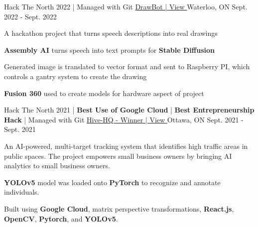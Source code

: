 \begin{cventries}

  \cventry
    {Hack The North 2022 | Managed with Git} %
    {\underline{DrawBot | \href{https://devpost.com/software/drawbot-ulof5z}{View \ExternalLink}}} %
    {Waterloo, ON} %
    {Sept. 2022 - Sept. 2022} %
    {
      \begin{cvitems} %
        \item {A hackathon project that turns speech descriptions into real drawings}
        \item {\textbf{Assembly AI} turns speech into text prompts for \textbf{Stable Diffusion}}
        \item {Generated image is translated to vector format and sent to Raspberry PI, which controls a gantry system to create the drawing}
        \item {\textbf{Fusion 360} used to create models for hardware aspect of project}
      \end{cvitems}
    }


  \cventry
    {Hack The North 2021 | \textbf{Best Use of Google Cloud} | \textbf{Best Entrepreneurship Hack} | Managed with Git} %
    {\underline{Hive-HQ - Winner | \href{https://devpost.com/software/hive-hq}{View \ExternalLink}}} %
    {Ottawa, ON} %
    {Sept. 2021 - Sept. 2021} %
    {
      \begin{cvitems} %
        \item {An AI-powered, multi-target tracking system that identifies high traffic areas in public spaces. The project empowers small business owners by bringing AI analytics to small business owners.}
        \item {\textbf{YOLOv5} model was loaded onto \textbf{PyTorch} to recognize and annotate individuals.}
        \item {Built using \textbf{Google Cloud}, matrix perspective transformations, \textbf{React.js}, \textbf{OpenCV}, \textbf{Pytorch}, and \textbf{YOLOv5}.}
      \end{cvitems}
    }


\end{cventries}
